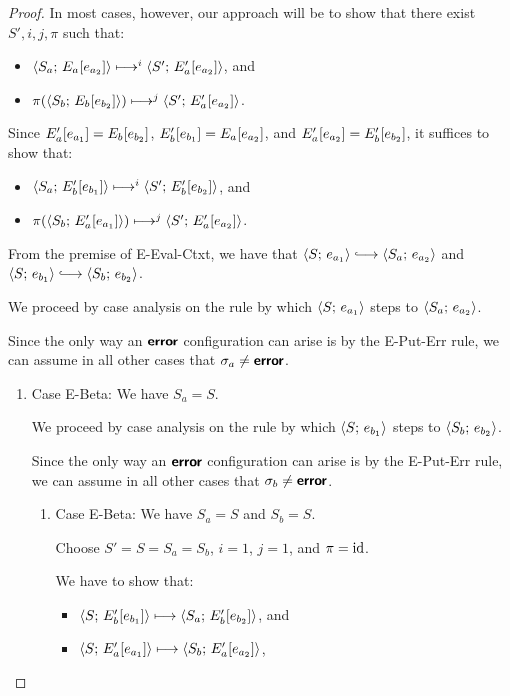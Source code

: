 \begin{proof}
  In most cases, however, our approach will be to show that there
  exist $S', i, j, \pi$ such that:
  \begin{itemize}
  \item $\langle S_a;\, E_a\hspace{-0.5mm}\left[e_{a_2}\right] \rangle \longmapsto^i
    \langle S';\, E'_a\hspace{-0.5mm}\left[e_{a_2}\right] \rangle$, and
  \item $\pi(\langle S_b;\, E_b\hspace{-0.5mm}\left[e_{b_2}\right] \rangle) \longmapsto^j
    \langle S';\, E'_a\hspace{-0.5mm}\left[e_{a_2}\right] \rangle$.
  \end{itemize}
  Since $E'_a\hspace{-0.5mm}\left[e_{a_1}\right] = E_b\hspace{-0.5mm}\left[e_{b_2}\right]$,
  $E'_b\hspace{-0.5mm}\left[e_{b_1}\right] = E_a\hspace{-0.5mm}\left[e_{a_2}\right]$, and
  $E'_a\hspace{-0.5mm}\left[e_{a_2}\right] = E'_b\hspace{-0.5mm}\left[e_{b_2}\right]$, it suffices
  to show that:
  \begin{itemize}
  \item $\langle S_a;\, E'_b\hspace{-0.5mm}\left[e_{b_1}\right] \rangle \longmapsto^i
    \langle S';\, E'_b\hspace{-0.5mm}\left[e_{b_2}\right] \rangle$, and
  \item $\pi(\langle S_b;\, E'_a\hspace{-0.5mm}\left[e_{a_1}\right] \rangle) \longmapsto^j
    \langle S';\, E'_a\hspace{-0.5mm}\left[e_{a_2}\right] \rangle$.
  \end{itemize}
  From the premise of {\sc E-Eval-Ctxt}, we have that
  $\config{S}{e_{a_1}} \parstepsto \config{S_a}{e_{a_2}}$ and
  $\config{S}{e_{b_1}} \parstepsto \config{S_b}{e_{b_2}}$.

  We proceed by case analysis on the rule by which
  $\langle S;\, e_{a_1} \rangle$ steps to $\langle S_a;\, e_{a_2} \rangle$.

  Since the only way an $\textbf{\textsf{error}}$ configuration can arise is by the
  {\sc E-Put-Err} rule, we can assume in all other cases that $\sigma_a
  \neq \textbf{\textsf{error}}$.

  \begin{enumerate}
  \item Case {\sc E-Beta}: We have $S_a = S$.

    We proceed by case analysis on the rule by which
    $\langle S;\, e_{b_1} \rangle$ steps to $\langle S_b;\, e_{b_2} \rangle$.

    Since the only way an $\textbf{\textsf{error}}$ configuration can arise is by the
    {\sc E-Put-Err} rule, we can assume in all other cases that
    $\sigma_b \neq \textbf{\textsf{error}}$.
    \begin{enumerate}
    \item \label{slqc-beta-beta}Case {\sc E-Beta}: We have $S_a = S$
      and $S_b = S$.

      Choose $S' = S = S_a = S_b$, $i = 1$, $j = 1$, and $\pi = \mathrm{id}$.

      We have to show that:
      \begin{itemize}
      \item $\langle S;\, E'_b\hspace{-0.5mm}\left[e_{b_1}\right] \rangle \longmapsto
        \langle S_a;\, E'_b\hspace{-0.5mm}\left[e_{b_2}\right] \rangle$, and
      \item $\langle S;\, E'_a\hspace{-0.5mm}\left[e_{a_1}\right] \rangle \longmapsto
        \langle S_b;\, E'_a\hspace{-0.5mm}\left[e_{a_2}\right] \rangle$, 
      \end{itemize}


\end{enumerate}
\end{enumerate}
\end{proof}
